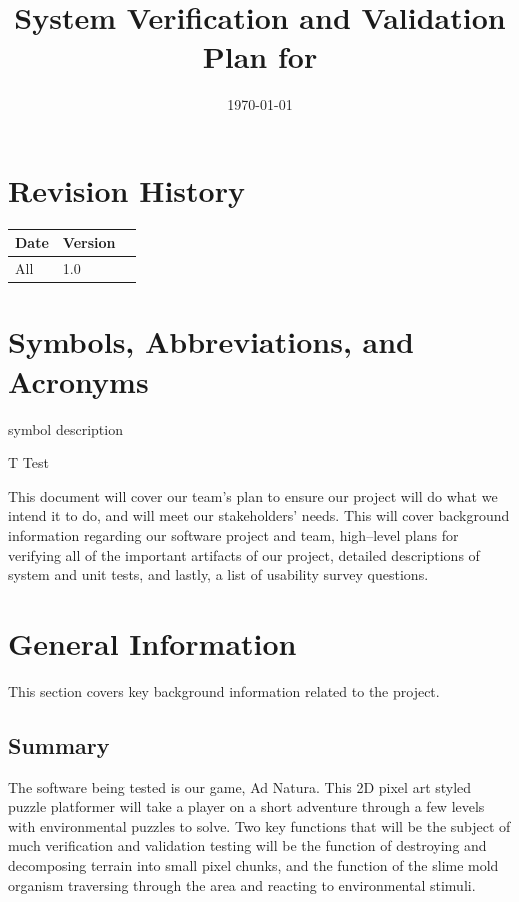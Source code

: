 \documentclass[12pt, titlepage]{article}
\begin{document}
\title{System Verification and Validation Plan for \progname{}} 
\author{\authname}
\date{\today}
	
\maketitle


\section*{Revision History}

\begin{tabularx}{\textwidth}{p{3cm}p{2cm}X}
\toprule {\bf Date} & {\bf Version}\\
\midrule
All & 1.0\\
\bottomrule
\end{tabularx}

\newpage

\tableofcontents

\section{Symbols, Abbreviations, and Acronyms}

symbol description

T Test

This document will cover our team’s plan to ensure our project will do what we intend it to do, and will meet our stakeholders’ needs. This will cover background information regarding our software project and team, high--level plans for verifying all of the important artifacts of our project, detailed descriptions of system and unit tests, and lastly, a list of usability survey questions.

\section{General Information}

This section covers key background information related to the project.

\subsection{Summary}

The software being tested is our game, Ad Natura. This 2D pixel art styled puzzle platformer will take a player on a short adventure through a few levels with environmental puzzles to solve. Two key functions that will be the subject of much verification and validation testing will be the function of destroying and decomposing terrain into small pixel chunks, and the function of the slime mold organism traversing through the area and reacting to environmental stimuli.
\end{document}
